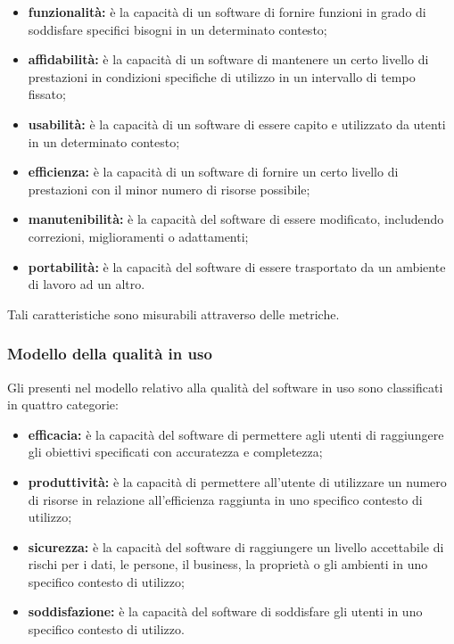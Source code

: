 \documentclass[PianoDiQualifica.tex]{subfiles}
\begin{document}
\begin{itemize}
\item \textbf{funzionalità:} è la capacità di un software di fornire funzioni in grado di soddisfare specifici bisogni in un determinato contesto;
\item \textbf{affidabilità:} è la capacità di un software di mantenere un certo livello di prestazioni in condizioni specifiche di utilizzo in un intervallo di tempo fissato;
\item \textbf{usabilità:} è la capacità di un software di essere capito e utilizzato da utenti in un determinato contesto;
\item \textbf{efficienza:} è la capacità di un software di fornire un certo livello di prestazioni con il minor numero di risorse possibile;
\item \textbf{manutenibilità:} è la capacità del software di essere modificato, includendo correzioni, miglioramenti o adattamenti;
\item \textbf{portabilità:} è la capacità del software di essere trasportato da un ambiente di lavoro ad un altro.
\end{itemize}

Tali caratteristiche sono misurabili attraverso delle metriche.

\subsubsection{Modello della qualità in uso}
Gli  presenti nel modello relativo alla qualità del software in uso
sono classificati in quattro categorie:

\begin{itemize}
\item \textbf{efficacia:} è la capacità del software di permettere agli utenti di raggiungere gli obiettivi specificati con accuratezza e completezza;
\item \textbf{produttività:} è la capacità di permettere all’utente di utilizzare un numero di risorse in relazione all’efficienza raggiunta in uno specifico contesto di utilizzo;
\item \textbf{sicurezza:} è la capacità del software di raggiungere un livello accettabile di rischi  per i dati, le persone, il business, la proprietà o gli ambienti in uno specifico contesto di utilizzo;
\item \textbf{soddisfazione:} è la capacità del software di soddisfare gli utenti in uno specifico contesto di utilizzo.
\end{itemize}
\end{document}
